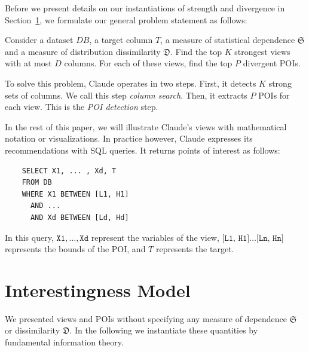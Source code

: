 Before we present details on our instantiations of strength and divergence in Section~\ref{sec:formalization}, we formulate our general problem statement as follows:
\begin{problem}
Consider a dataset $DB$, a target column $T$, a measure of statistical
dependence $\mathfrak{S}$ and a measure of distribution dissimilarity
$\mathfrak{D}$. Find the top $K$ strongest views with at most $D$ columns. For
each of these views, find the top $P$ divergent POIs.
\end{problem}
To solve this problem, Claude operates in two steps. First, it detects $K$
strong sets of columns.  We call this step \emph{column search}.  Then, it
extracts $P$ POIs for each view. This is the \emph{POI detection} step.

In the rest of this paper, we will illustrate Claude's views with mathematical
notation or visualizations. In practice however, Claude expresses its
recommendations with SQL queries. It returns points of interest as follows:
\begin{verbatim}
    SELECT X1, ... , Xd, T
    FROM DB
    WHERE X1 BETWEEN [L1, H1]
      AND ... 
      AND Xd BETWEEN [Ld, Hd]
\end{verbatim}
In this query, $\texttt{X1},\ldots, \texttt{Xd}$ represent the variables of the
view, $\texttt{[L1, H1]}\ldots\texttt{[Ln, Hn]}$ represents the bounds of the
POI, and $T$ represents the target.




\section{Interestingness Model}
\label{sec:formalization}
We presented views and POIs without specifying any measure of dependence
$\mathfrak{S}$ or dissimilarity $\mathfrak{D}$. In the following we instantiate these
quantities by fundamental information theory.

